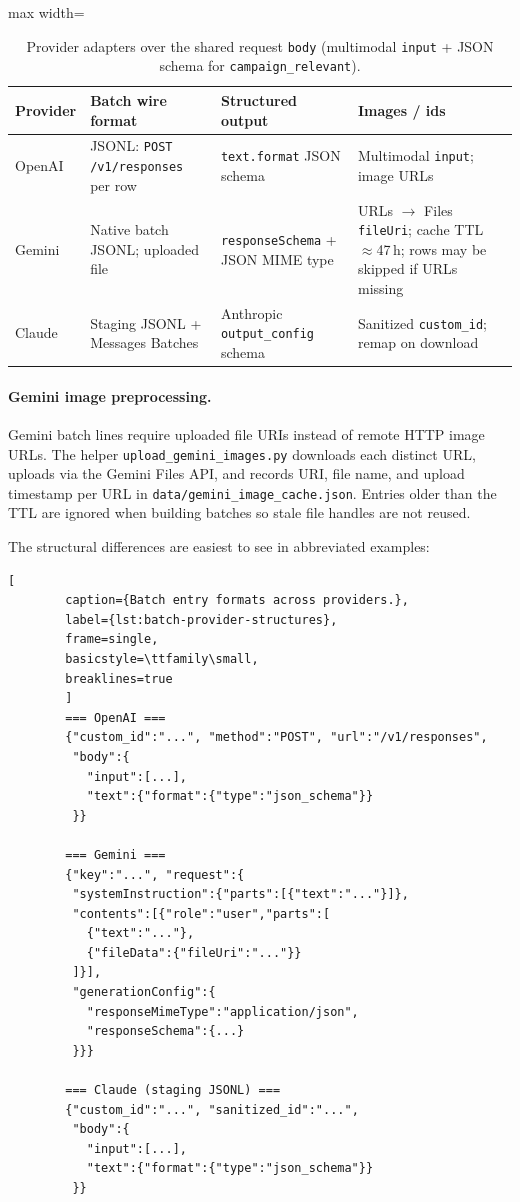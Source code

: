\begin{table}[htbp]
\centering
\footnotesize
\caption{Provider adapters over the shared request \texttt{body} (multimodal \texttt{input} + JSON schema for \texttt{campaign\_relevant}).}
\label{tab:provider-adapters}
\begin{adjustbox}{max width=\linewidth}
\begin{tabular}{p{1.8cm}p{3.6cm}p{3.2cm}p{3.5cm}}
\toprule
\textbf{Provider} & \textbf{Batch wire format} & \textbf{Structured output} & \textbf{Images / ids} \\
\midrule
OpenAI & JSONL: \texttt{POST} \texttt{/v1/responses} per row & \texttt{text.format} JSON schema & Multimodal \texttt{input}; image URLs \\
Gemini & Native batch JSONL; uploaded file & \texttt{responseSchema} + JSON MIME type & URLs $\rightarrow$ Files \texttt{fileUri}; cache TTL $\approx$47\,h; rows may be skipped if URLs missing \\
Claude & Staging JSONL + Messages Batches & Anthropic \texttt{output\_config} schema & Sanitized \texttt{custom\_id}; remap on download \\
\bottomrule
\end{tabular}
\end{adjustbox}
\end{table}

\paragraph{Gemini image preprocessing.}
Gemini batch lines require uploaded file URIs instead of remote HTTP image URLs. The helper \texttt{upload\_gemini\_images.py} downloads each distinct URL, uploads via the Gemini Files API, and records URI, file name, and upload timestamp per URL in \texttt{data/gemini\_image\_cache.json}. Entries older than the TTL are ignored when building batches so stale file handles are not reused.

The structural differences are easiest to see in abbreviated examples:

\begin{lstlisting}[
        caption={Batch entry formats across providers.},
        label={lst:batch-provider-structures},
        frame=single,
        basicstyle=\ttfamily\small,
        breaklines=true
        ]
        === OpenAI ===
        {"custom_id":"...", "method":"POST", "url":"/v1/responses",
         "body":{
           "input":[...],
           "text":{"format":{"type":"json_schema"}}
         }}
        
        === Gemini ===
        {"key":"...", "request":{
         "systemInstruction":{"parts":[{"text":"..."}]},
         "contents":[{"role":"user","parts":[
           {"text":"..."},
           {"fileData":{"fileUri":"..."}}
         ]}],
         "generationConfig":{
           "responseMimeType":"application/json",
           "responseSchema":{...}
         }}}
        
        === Claude (staging JSONL) ===
        {"custom_id":"...", "sanitized_id":"...",
         "body":{
           "input":[...],
           "text":{"format":{"type":"json_schema"}}
         }}
        \end{lstlisting}

